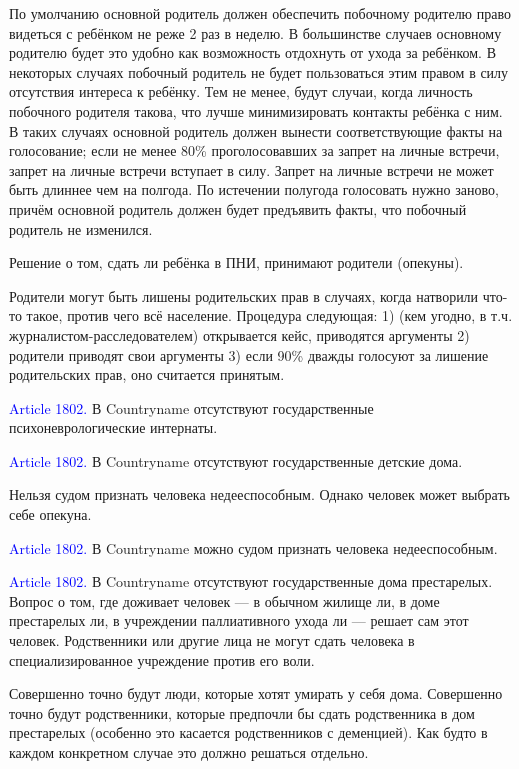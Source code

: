 \documentclass[11pt]{article}
\theoremstyle{remark}
\theoremstyle{definition}
\begin{document}
По умолчанию основной родитель должен обеспечить побочному родителю право видеться с ребёнком не реже 2 раз в неделю. В большинстве случаев основному родителю будет это удобно как возможность отдохнуть от ухода за ребёнком. В некоторых случаях побочный родитель не будет пользоваться этим правом в силу отсутствия интереса к ребёнку. Тем не менее, будут случаи, когда личность побочного родителя такова, что лучше минимизировать контакты ребёнка с ним. В таких случаях основной родитель должен вынести соответствующие факты на голосование; если не менее 80\% проголосовавших за запрет на личные встречи, запрет на личные встречи вступает в силу. Запрет на личные встречи не может быть длиннее чем на полгода. По истечении полугода голосовать нужно заново, причём основной родитель должен будет предъявить факты, что побочный родитель не изменился.








Решение о том, сдать ли ребёнка в ПНИ, принимают родители (опекуны).

Родители могут быть лишены родительских прав в случаях, когда натворили что-то такое, против чего всё население. Процедура следующая:
1) (кем угодно, в т.ч. журналистом-расследователем) открывается кейс, приводятся аргументы
2) родители приводят свои аргументы
3) если 90\% дважды голосуют за лишение родительских прав, оно считается принятым.


\textcolor{blue}{Article 1802.} В Countryname отсутствуют государственные психоневрологические интернаты.


\textcolor{blue}{Article 1802.} В Countryname отсутствуют государственные детские дома.

Нельзя судом признать человека недееспособным. Однако человек может выбрать себе опекуна.

\textcolor{blue}{Article 1802.} В Countryname можно судом признать человека недееспособным.


\textcolor{blue}{Article 1802.} В Countryname отсутствуют государственные дома престарелых. Вопрос о том, где доживает человек --- в обычном жилище ли, в доме престарелых ли, в учреждении паллиативного ухода ли --- решает сам этот человек. Родственники или другие лица не могут сдать человека в специализированное учреждение против его воли.

\color{blue}



Совершенно точно будут люди, которые хотят умирать у себя дома. Совершенно точно будут родственники, которые предпочли бы сдать родственника в дом престарелых (особенно это касается родственников с деменцией). Как будто в каждом конкретном случае это должно решаться отдельно.
\end{document}

